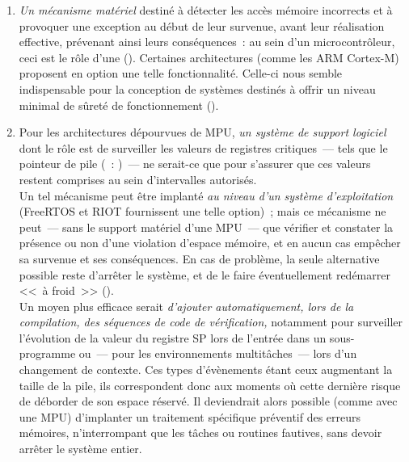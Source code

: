 \begin{enumerate}

\item \emph{Un mécanisme matériel} destiné à détecter les accès mémoire
incorrects et à provoquer une exception au début de leur survenue, avant
leur réalisation effective, prévenant ainsi leurs conséquences~: au sein
d'un microcontrôleur, ceci est le rôle d'une  (). Certaines architectures (comme les ARM Cortex-M)
proposent en option une telle fonctionnalité. Celle-ci nous semble
indispensable pour la conception de systèmes destinés à offrir un niveau
minimal de sûreté de fonctionnement ().

\medskip

\item Pour les architectures dépourvues de MPU, \emph{un système de
support logiciel} dont le rôle est de surveiller les valeurs de registres
critiques~--- tels que le pointeur de pile (~: )~--- ne serait-ce que pour s'assurer que ces valeurs restent
comprises au sein d'intervalles autorisés.\\
Un tel mécanisme peut être implanté \emph{au niveau d'un système
d'exploitation} (FreeRTOS et RIOT fournissent une telle option)~;
mais ce mécanisme ne peut~--- sans le support matériel d'une MPU~--- que
vérifier et constater la présence ou non d'une violation d'espace mémoire,
et en aucun cas empêcher sa survenue et ses conséquences. En cas de problème,
la seule alternative possible reste d'arrêter le système, et de le faire
éventuellement redémarrer <<~à froid~>> ().\\
Un moyen plus efficace serait \emph{d'ajouter automatiquement, lors
de la compilation, des séquences de code de vérification,} notamment pour
surveiller l'évolution de la valeur du registre SP lors de l'entrée
dans un sous-programme ou~--- pour les environnements multitâches~---
lors d'un changement de contexte. Ces types d'évènements étant ceux
augmentant la taille de la pile, ils correspondent donc aux moments
où cette dernière risque de déborder de son espace réservé.
Il deviendrait alors possible (comme avec une MPU) d'implanter un
traitement spécifique préventif des erreurs mémoires, n'interrompant que
les tâches ou routines fautives, sans devoir arrêter le système entier.

\end{enumerate}

\bigskip

